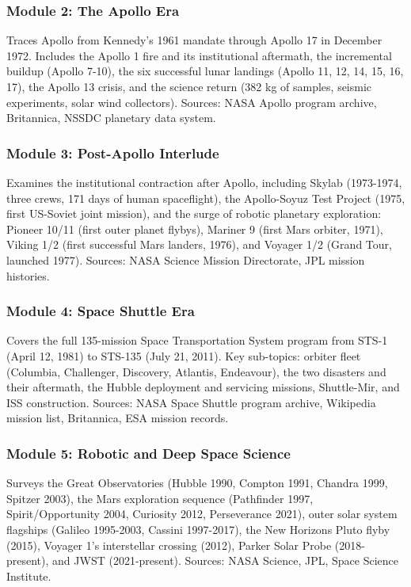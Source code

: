 \documentclass[11pt,letterpaper]{article}
\begin{document}
\subsubsection{Module 2: The Apollo Era}

Traces Apollo from Kennedy's 1961 mandate through Apollo 17 in December 1972. Includes the Apollo 1 fire and its institutional aftermath, the incremental buildup (Apollo 7-10), the six successful lunar landings (Apollo 11, 12, 14, 15, 16, 17), the Apollo 13 crisis, and the science return (382 kg of samples, seismic experiments, solar wind collectors). Sources: NASA Apollo program archive, Britannica, NSSDC planetary data system.

\subsubsection{Module 3: Post-Apollo Interlude}

Examines the institutional contraction after Apollo, including Skylab (1973-1974, three crews, 171 days of human spaceflight), the Apollo-Soyuz Test Project (1975, first US-Soviet joint mission), and the surge of robotic planetary exploration: Pioneer 10/11 (first outer planet flybys), Mariner 9 (first Mars orbiter, 1971), Viking 1/2 (first successful Mars landers, 1976), and Voyager 1/2 (Grand Tour, launched 1977). Sources: NASA Science Mission Directorate, JPL mission histories.

\subsubsection{Module 4: Space Shuttle Era}

Covers the full 135-mission Space Transportation System program from STS-1 (April 12, 1981) to STS-135 (July 21, 2011). Key sub-topics: orbiter fleet (Columbia, Challenger, Discovery, Atlantis, Endeavour), the two disasters and their aftermath, the Hubble deployment and servicing missions, Shuttle-Mir, and ISS construction. Sources: NASA Space Shuttle program archive, Wikipedia mission list, Britannica, ESA mission records.

\subsubsection{Module 5: Robotic and Deep Space Science}

Surveys the Great Observatories (Hubble 1990, Compton 1991, Chandra 1999, Spitzer 2003), the Mars exploration sequence (Pathfinder 1997, Spirit/Opportunity 2004, Curiosity 2012, Perseverance 2021), outer solar system flagships (Galileo 1995-2003, Cassini 1997-2017), the New Horizons Pluto flyby (2015), Voyager 1's interstellar crossing (2012), Parker Solar Probe (2018-present), and JWST (2021-present). Sources: NASA Science, JPL, Space Science Institute.
\end{document}

